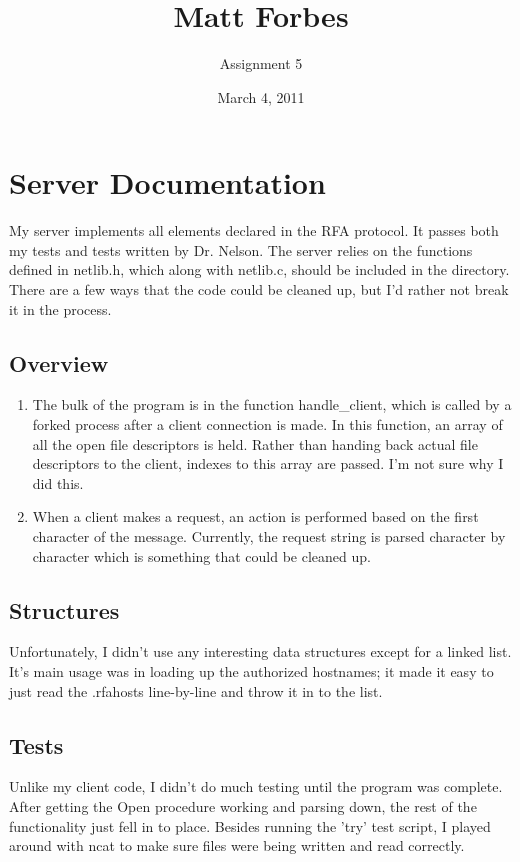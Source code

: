 \documentclass[a4paper,12pt]{article}
\begin{document}
\title{Matt Forbes}
\author{Assignment 5}
\date{March 4, 2011}
\maketitle

\section{Server Documentation}
My server implements all elements declared in the RFA protocol. It
passes both my tests and tests written by Dr. Nelson. The server
relies on the functions defined in netlib.h, which along with
netlib.c, should be included in the directory. There are a few ways
that the code could be cleaned up, but I'd rather not break it in the
process.

\subsection{Overview}
\begin{enumerate}[]
  \item The bulk of the program is in the function handle\_client,
    which is called by a forked process after a client connection is
    made. In this function, an array of all the open file descriptors
    is held. Rather than handing back actual file descriptors to the
    client, indexes to this array are passed. I'm not sure why I did
    this.

  \item When a client makes a request, an action is performed based
    on the first character of the message. Currently, the request
    string is parsed character by character which is something that
    could be cleaned up. 

\end{enumerate}

\subsection{Structures}
Unfortunately, I didn't use any interesting data structures except for
a linked list. It's main usage was in loading up the authorized
hostnames; it made it easy to just read the .rfahosts line-by-line and
throw it in to the list.

\subsection{Tests}
Unlike my client code, I didn't do much testing until the program was
complete. After getting the Open procedure working and parsing down,
the rest of the functionality just fell in to place. Besides running
the 'try' test script, I played around with ncat to make sure files
were being written and read correctly.
\end{document}
